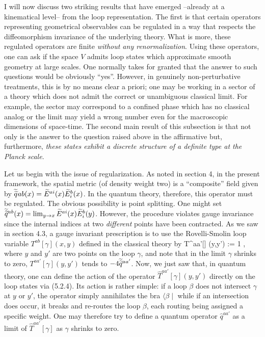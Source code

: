 I will now discuss two striking results that have emerged --already at a
kinematical level-- from the loop representation. The first is that certain
operators representing geometrical observables can be regulated in a way
that respects the diffeomorphism invariance of the underlying theory. What
is more, these regulated operators are finite {\it without any
renormalization}. Using these operators, one can ask if the space $V$
admits loop states which approximate smooth geometry at large scales.
One normally takes for granted that the answer to such questions would be
obviously ``yes''.  However, in genuinely non-perturbative treatments,
this is by no means clear a priori; one may be working in a sector of a
theory which does not admit the correct or unambiguous classical limit.
For example, the sector may correspond to a confined phase which has no
classical analog or the limit may yield a wrong number even for the macroscopic
dimensions of space-time. The second main result of this subsection is
that not only is the answer to the question raised above in the affirmative
but, furthermore, {\it these states exhibit a discrete structure of a
definite type at the Planck scale}.

Let us begin with the issue of regularization. As noted in section 4, in
the present framework, the spatial metric (of density weight two) is a
``composite'' field given by $\widetilde{\widetilde{q}}^{}{ab}(x) = \widetilde{E}^{ai} (x)
\widetilde{E}^b_i(x)$. In the quantum theory, therefore, this operator must be
regulated. The obvious possibility is point splitting. One might set
${\widetilde{\widetilde q}}{}^{ab}(x) = \lim_{y\rightarrow x} \widetilde{E}^{ai}(x) \widetilde{E}^b_i(y)$.
However, the procedure violates gauge invariance since the internal indices
at two {\it different} points have been contracted. As we saw in section 4.3,
a gauge invariant prescription is to use the Rovelli-Smolin loop variable
$T^{ab} [\gamma ](x,y)$ defined in the classical theory by
\bneq
T^{aa'}[\gamma ] (y,y') := {1} \tr{},
where $y$ and $y'$ are two points on the loop $\gamma$, and note that
in the limit $\gamma$ shrinks to zero, $T^{aa'}[\gamma](y,y')$ tends to
$-4\widetilde{\widetilde{q}}{}^{aa'}$. Now, we just saw that, in quantum theory, one can
define the action of the operator $\hat{T}^{aa'}[\gamma](y,y')$
directly on the loop states via (5.2.4). Its action is rather simple: if a
loop $\beta$ does not intersect $\gamma$ at $y$ or $y'$, the operator simply
annihilates the bra $\langle\beta\mid$ while if an intersection does occur,
it breaks and re-routes the loop $\beta$, each routing being assigned a
specific weight. One may therefore try to define a quantum operator
$\hat{q}^{aa'}$ as a limit of $\hat{T}^{aa'}[\gamma ]$ as $\gamma$ shrinks
to zero.


